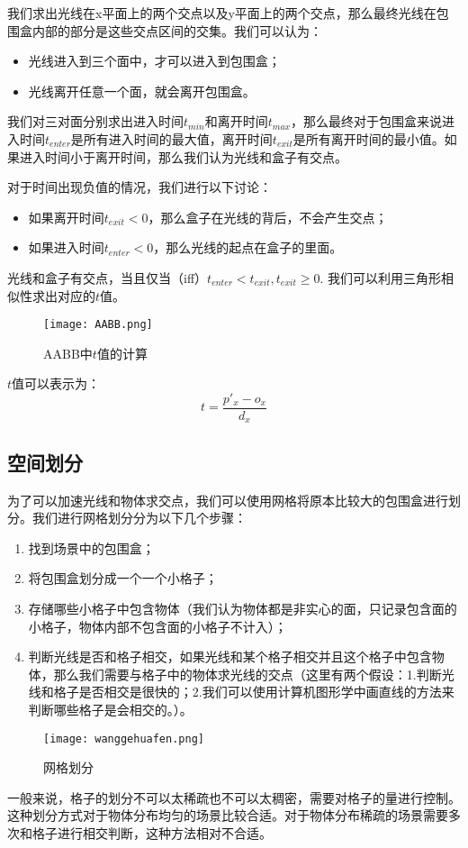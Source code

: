\documentclass[openany]{progbookcn}
\begin{document}
我们求出光线在x平面上的两个交点以及y平面上的两个交点，那么最终光线在包围盒内部的部分是这些交点区间的交集。我们可以认为：
\begin{itemize}
	\item 光线进入到三个面中，才可以进入到包围盒；
	\item 光线离开任意一个面，就会离开包围盒。
\end{itemize}
我们对三对面分别求出进入时间$t_{min}$和离开时间$t_{max}$，那么最终对于包围盒来说进入时间$t_{enter}$是所有进入时间的最大值，离开时间$t_{exit}$是所有离开时间的最小值。如果进入时间小于离开时间，那么我们认为光线和盒子有交点。

对于时间出现负值的情况，我们进行以下讨论：
\begin{itemize}
	\item 如果离开时间$t_{exit}<0$，那么盒子在光线的背后，不会产生交点；
	\item 如果进入时间$t_{enter} < 0$，那么光线的起点在盒子的里面。
\end{itemize}

光线和盒子有交点，当且仅当（iff）$t_{enter}<t_{exit}, t_{exit}\geq 0$.
我们可以利用三角形相似性求出对应的$t$值。
\begin{figure}[H]
	\centering
	\texttt{[image: AABB.png]}
	\caption{AABB中$t$值的计算}
	\label{fig:aabb}
\end{figure}
$t$值可以表示为：
\begin{equation}
	t=\frac{p'_x-o_x}{d_x}
\end{equation}

\subsection{空间划分}
为了可以加速光线和物体求交点，我们可以使用网格将原本比较大的包围盒进行划分。我们进行网格划分分为以下几个步骤：
\begin{enumerate}
	\item 找到场景中的包围盒；
	\item 将包围盒划分成一个一个小格子；
	\item 存储哪些小格子中包含物体（我们认为物体都是非实心的面，只记录包含面的小格子，物体内部不包含面的小格子不计入）；
	\item 判断光线是否和格子相交，如果光线和某个格子相交并且这个格子中包含物体，那么我们需要与格子中的物体求光线的交点（这里有两个假设：1.判断光线和格子是否相交是很快的；2.我们可以使用计算机图形学中画直线的方法来判断哪些格子是会相交的。）。
\end{enumerate}
\begin{figure}[H]
	\centering
	\texttt{[image: wanggehuafen.png]}
	\caption{网格划分}
	\label{fig:wghf}
\end{figure}
一般来说，格子的划分不可以太稀疏也不可以太稠密，需要对格子的量进行控制。这种划分方式对于物体分布均匀的场景比较合适。对于物体分布稀疏的场景需要多次和格子进行相交判断，这种方法相对不合适。
\end{document}
